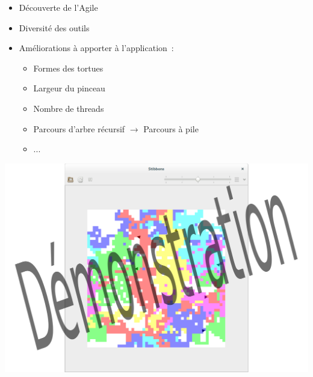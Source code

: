 \begin{frame}
\begin{itemize}
\item Découverte de l'Agile
\item Diversité des outils
\item Améliorations à apporter à l'application~:
	\begin{itemize}
	\item Formes des tortues
	\item Largeur du pinceau
	\item Nombre de threads
	\item Parcours d'arbre récursif $\rightarrow$ Parcours à pile
	\item ...
	\end{itemize}
\end{itemize}
\end{frame}

\begin{frame}
\includegraphics[scale=0.3]{doc/Presentation/image/demo.pdf}
\end{frame}
